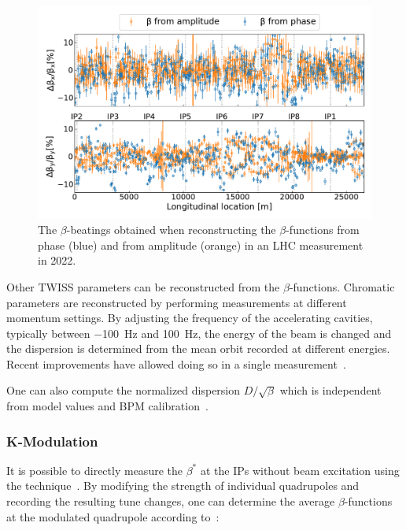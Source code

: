 \begin{figure}[!htb]
  \centering
  \includegraphics*[width=0.99\linewidth]{Figures/Optics_Measurements_Corrections_at_LHC/betabeat_phase_vs_amp.pdf}
  \caption{The \(\beta\)-beatings obtained when reconstructing the \(\beta\)-functions from phase (\textcolor{mplblue}{blue}) and from amplitude (\textcolor{mplorange}{orange}) in an LHC measurement in \num{2022}.}
  \label{figure:betabeating_phase_vs_amp}
\end{figure}

Other TWISS parameters can be reconstructed from the \(\beta\)-functions.
Chromatic parameters are reconstructed by performing measurements at different momentum settings.
By adjusting the frequency of the accelerating cavities, typically between \qty{-100}{\hertz} and \qty{+100}{\hertz}, the energy of the beam is changed and the dispersion is determined from the mean orbit recorded at different energies.
Recent improvements have allowed doing so in a single measurement~\cite{PHD:Malina, IPAC:Malina:3D_Excitation}.

One can also compute the normalized dispersion \(D / \sqrt{\beta}\) which is independent from model values and BPM calibration~\cite{PAC:Calaga:BPM_Calibration_Independent_LHC_Optics_Correction}.

\subsubsection*{K-Modulation}

It is possible to directly measure the \(\beta^{\ast}\) at the IPs without beam excitation using the  technique~\cite{IPAC:Calaga:LHC_K_Modulation}.
By modifying the strength of individual quadrupoles and recording the resulting tune changes, one can determine the average \(\beta\)-functions at the modulated quadrupole according to~\cite{BOOK:Minty:Measurements_Control_Charged_Particle_Beams}:

